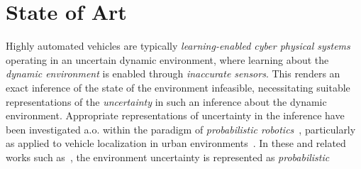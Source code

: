 \section{State of Art}\label{sec:relatedwork}
Highly automated vehicles are typically \emph{learning-enabled cyber physical systems} operating in an uncertain dynamic environment, where learning about the \emph{dynamic environment} is enabled through \emph{inaccurate sensors}. This renders an exact inference of the state of the environment infeasible, necessitating suitable representations of the \emph{uncertainty} in such an inference about the dynamic environment. Appropriate representations of uncertainty in the inference have been investigated a.o. within the paradigm of \emph{probabilistic robotics}~\cite{probrob}, particularly as applied to vehicle localization in urban environments~\cite{Thrun2007,Thrun2009,Thrun2010}. In these and related works such as~\cite{Perrolaz2014,moras2014}, the environment uncertainty is represented as \emph{probabilistic
}
